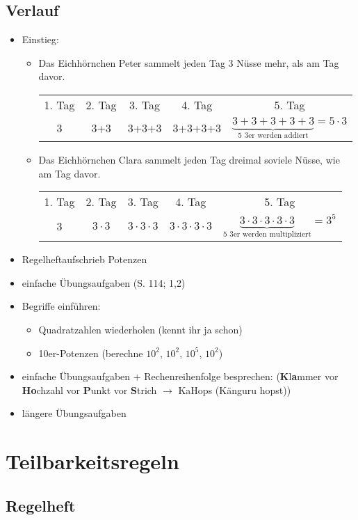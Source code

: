 \documentclass[parskip=half-,a4paper]{scrartcl} %
\begin{document}
\subsection{Verlauf}
\begin{itemize}
	\item Einstieg:
	\begin{itemize}
		\item Das Eichhörnchen Peter sammelt jeden Tag 3 Nüsse mehr, als am Tag davor.

		\begin{tabular}{ccccc}
			1. Tag & 2. Tag & 3. Tag & 4. Tag & 5. Tag \\
			3 & 3+3 & 3+3+3 & 3+3+3+3 & $\underbrace{3+3+3+3+3}_{\text{5 3er werden
			addiert}} = 5 \cdot 3$
		\end{tabular}

		\item Das Eichhörnchen Clara sammelt jeden Tag dreimal soviele Nüsse, wie am Tag davor.

		\begin{tabular}{ccccc}
			1. Tag & 2. Tag & 3. Tag & 4. Tag & 5. Tag \\
			3 & $3\cdot3$ & $3\cdot3\cdot3$ & $3\cdot3\cdot3 \cdot3$ & $\underbrace{3\cdot3\cdot3\cdot3\cdot3}_{\text{5 3er werden
			multipliziert}} = 3^5$
		\end{tabular}
\end{itemize}
	\item Regelheftaufschrieb Potenzen
	\item einfache Übungsaufgaben (S. 114; 1,2)
	\item Begriffe einführen:
		\begin{itemize}
			\item Quadratzahlen wiederholen (kennt ihr ja schon)
			\item 10er-Potenzen (berechne $10^2$, $10^2$, $10^5$, $10^2$)
		\end{itemize}
	\item einfache Übungsaufgaben + Rechenreihenfolge besprechen:
		(\textbf{K}l\textbf{a}mmer vor \textbf{Ho}chzahl vor \textbf{P}unkt vor
		\textbf{S}trich $\to$ KaHops (Känguru hopst))
	\item längere Übungsaufgaben
\end{itemize}
\section{Teilbarkeitsregeln}
\subsection{Regelheft}
\end{document}
